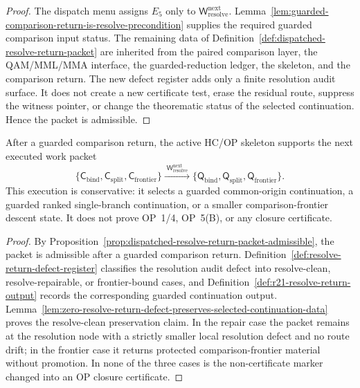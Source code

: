 \begin{proof}
The dispatch menu assigns \(E_5\) only to \(\mathsf W_{\mathrm{resolve}}^{\mathrm{next}}\). Lemma~\ref{lem:guarded-comparison-return-is-resolve-precondition} supplies the required guarded comparison input status. The remaining data of Definition~\ref{def:dispatched-resolve-return-packet} are inherited from the paired comparison layer, the QAM/MML/MMA interface, the guarded-reduction ledger, the skeleton, and the comparison return. The new defect register adds only a finite resolution audit surface. It does not create a new certificate test, erase the residual route, suppress the witness pointer, or change the theorematic status of the selected continuation. Hence the packet is admissible.
\end{proof}

\begin{theorem}
\label{thm:first-dispatched-resolve-return-packet}
After a guarded comparison return, the active HC/OP skeleton supports the next executed work packet
\[
 \{\mathsf C_{\mathrm{bind}},\mathsf C_{\mathrm{split}},\mathsf C_{\mathrm{frontier}}\}
 \xrightarrow{\;\mathsf W_{\mathrm{resolve}}^{\mathrm{next}}\;}
 \{\mathsf Q_{\mathrm{bind}},\mathsf Q_{\mathrm{split}},\mathsf Q_{\mathrm{frontier}}\}.
\]
This execution is conservative: it selects a guarded common-origin continuation, a guarded ranked single-branch continuation, or a smaller comparison-frontier descent state. It does not prove OP~1/4, OP~5(B), or any closure certificate.
\end{theorem}

\begin{proof}
By Proposition~\ref{prop:dispatched-resolve-return-packet-admissible}, the packet is admissible after a guarded comparison return. Definition~\ref{def:resolve-return-defect-register} classifies the resolution audit defect into resolve-clean, resolve-repairable, or frontier-bound cases, and Definition~\ref{def:r21-resolve-return-output} records the corresponding guarded continuation output. Lemma~\ref{lem:zero-resolve-return-defect-preserves-selected-continuation-data} proves the resolve-clean preservation claim. In the repair case the packet remains at the resolution node with a strictly smaller local resolution defect and no route drift; in the frontier case it returns protected comparison-frontier material without promotion. In none of the three cases is the non-certificate marker changed into an OP closure certificate.
\end{proof}

